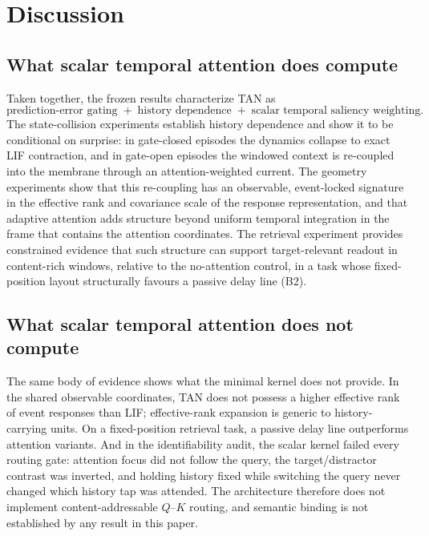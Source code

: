 \section{Discussion}\label{sec:discussion}

\subsection{What scalar temporal attention does compute}
\label{sec:disc-what}

Taken together, the frozen results characterize TAN as
\begin{equation*}
  \boxed{\text{prediction-error gating} \;+\;
    \text{history dependence} \;+\;
    \text{scalar temporal saliency weighting}.}
\end{equation*}
The state-collision experiments establish history dependence and show it
to be conditional on surprise: in gate-closed episodes the dynamics
collapse to exact LIF contraction, and in gate-open episodes the
windowed context is re-coupled into the membrane through an
attention-weighted current.  The geometry experiments show that this
re-coupling has an observable, event-locked signature in the effective
rank and covariance scale of the response representation, and that
adaptive attention adds structure beyond uniform temporal integration in
the frame that contains the attention coordinates.  The retrieval
experiment provides constrained evidence that such structure can support
target-relevant readout in content-rich windows, relative to the
no-attention control, in a task whose fixed-position layout
structurally favours a passive delay line (B2).

\subsection{What scalar temporal attention does not compute}
\label{sec:disc-whatnot}

The same body of evidence shows what the minimal kernel does not
provide.  In the shared observable coordinates, TAN does not possess a
higher effective rank of event responses than LIF; effective-rank
expansion is generic to history-carrying units.  On a fixed-position
retrieval task, a passive delay line outperforms attention variants.
And in the identifiability audit, the scalar kernel failed every
routing gate: attention focus did not follow the query, the
target/distractor contrast was inverted, and holding history fixed while
switching the query never changed which history tap was attended.  The
architecture therefore does not implement content-addressable
$Q$--$K$ routing, and semantic binding is not established by any result
in this paper.

